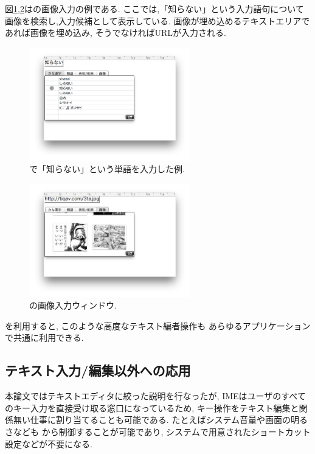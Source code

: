 図\ref{image1},\ref{image2}は{\system}の画像入力の例である.
ここでは,「知らない」という入力語句について画像を検索し,入力候補として表示している.
画像が埋め込めるテキストエリアであれば画像を埋め込み,
そうでなければURLが入力される.

\begin{figure}[H]
\centerline{\includegraphics[width=70mm,bb=0 0 600 400]{figures/image1.png}}
\caption{{\system}で「知らない」という単語を入力した例.}
\label{image1}
\end{figure}

\begin{figure}[H]
\centerline{\includegraphics[width=70mm,bb=0 0 600 400]{figures/image2.png}}
\caption{{\system}の画像入力ウィンドウ.}
\label{image2}
\end{figure}

{\system}を利用すると,
このような高度なテキスト編者操作も
あらゆるアプリケーションで共通に利用できる.

\subsection{テキスト入力/編集以外への応用}

本論文ではテキストエディタに絞った説明を行なったが,
IMEはユーザのすべてのキー入力を直接受け取る窓口になっているため,
キー操作をテキスト編集と関係無い仕事に割り当てることも可能である.
%
たとえばシステム音量や画面の明るさなども
{\system}から制御することが可能であり,
システムで用意されたショートカット設定などが不要になる.

